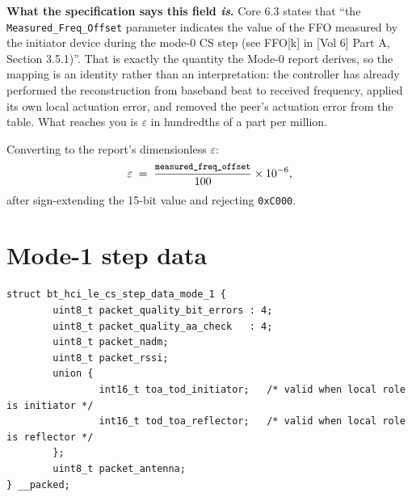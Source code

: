 \documentclass[11pt,a4paper]{article}
\newcommand{\code}[1]{\texttt{\small #1}}
\begin{document}
\begin{callout}
\textbf{What the specification says this field \emph{is}.} Core 6.3 states that
``the \code{Measured\_\allowbreak{}Freq\_\allowbreak{}Offset} parameter indicates the value of the FFO measured by the
initiator device during the mode-0 CS step (see FFO[k] in [Vol 6] Part A, Section 3.5.1)''. That is
exactly the quantity the Mode-0 report derives, so the mapping is an identity rather than an
interpretation: the controller has already performed the reconstruction from baseband beat to
received frequency, applied its own local actuation error, and removed the peer's actuation error
from the table. What reaches you is $\varepsilon$ in hundredths of a part per million.
\end{callout}

Converting to the report's dimensionless $\varepsilon$:
\begin{equation}
\varepsilon \;=\; \frac{\texttt{\footnotesize measured\_freq\_offset}}{100}\times10^{-6},
\label{eq:ffoconv}
\end{equation}
after sign-extending the 15-bit value and rejecting \code{0xC000}.

\section{Mode-1 step data}
\label{sec:mode1}

\begin{lstlisting}
struct bt_hci_le_cs_step_data_mode_1 {
        uint8_t packet_quality_bit_errors : 4;
        uint8_t packet_quality_aa_check   : 4;
        uint8_t packet_nadm;
        uint8_t packet_rssi;
        union {
                int16_t toa_tod_initiator;   /* valid when local role is initiator */
                int16_t tod_toa_reflector;   /* valid when local role is reflector */
        };
        uint8_t packet_antenna;
} __packed;
\end{lstlisting}
\end{document}
